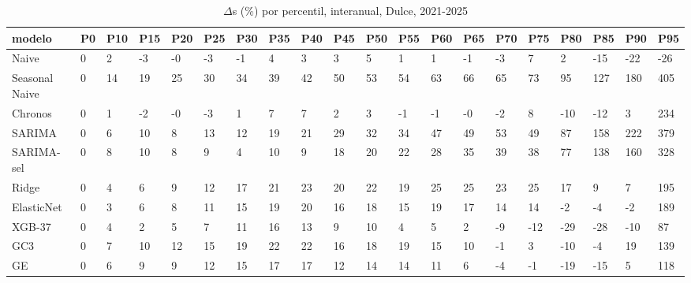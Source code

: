 \begin{table}[H]
\centering
\small
\caption{$\Delta$s (\%) por percentil, interanual, Dulce, 2021-2025}
\label{tab:T_barrido_delta_s_interanual_dulce}
\begin{tabular}{llllllllllllllllllll}
\toprule
modelo & P0 & P10 & P15 & P20 & P25 & P30 & P35 & P40 & P45 & P50 & P55 & P60 & P65 & P70 & P75 & P80 & P85 & P90 & P95 \\
\midrule
Naive & 0 & 2 & -3 & -0 & -3 & -1 & 4 & 3 & 3 & 5 & 1 & 1 & -1 & -3 & 7 & 2 & -15 & -22 & -26 \\
Seasonal Naive & 0 & 14 & 19 & 25 & 30 & 34 & 39 & 42 & 50 & 53 & 54 & 63 & 66 & 65 & 73 & 95 & 127 & 180 & 405 \\
Chronos & 0 & 1 & -2 & -0 & -3 & 1 & 7 & 7 & 2 & 3 & -1 & -1 & -0 & -2 & 8 & -10 & -12 & 3 & 234 \\
SARIMA & 0 & 6 & 10 & 8 & 13 & 12 & 19 & 21 & 29 & 32 & 34 & 47 & 49 & 53 & 49 & 87 & 158 & 222 & 379 \\
SARIMA-sel & 0 & 8 & 10 & 8 & 9 & 4 & 10 & 9 & 18 & 20 & 22 & 28 & 35 & 39 & 38 & 77 & 138 & 160 & 328 \\
Ridge & 0 & 4 & 6 & 9 & 12 & 17 & 21 & 23 & 20 & 22 & 19 & 25 & 25 & 23 & 25 & 17 & 9 & 7 & 195 \\
ElasticNet & 0 & 3 & 6 & 8 & 11 & 15 & 19 & 20 & 16 & 18 & 15 & 19 & 17 & 14 & 14 & -2 & -4 & -2 & 189 \\
XGB-37 & 0 & 4 & 2 & 5 & 7 & 11 & 16 & 13 & 9 & 10 & 4 & 5 & 2 & -9 & -12 & -29 & -28 & -10 & 87 \\
GC3 & 0 & 7 & 10 & 12 & 15 & 19 & 22 & 22 & 16 & 18 & 19 & 15 & 10 & -1 & 3 & -10 & -4 & 19 & 139 \\
GE & 0 & 6 & 9 & 9 & 12 & 15 & 17 & 17 & 12 & 14 & 14 & 11 & 6 & -4 & -1 & -19 & -15 & 5 & 118 \\
\bottomrule
\end{tabular}
\end{table}